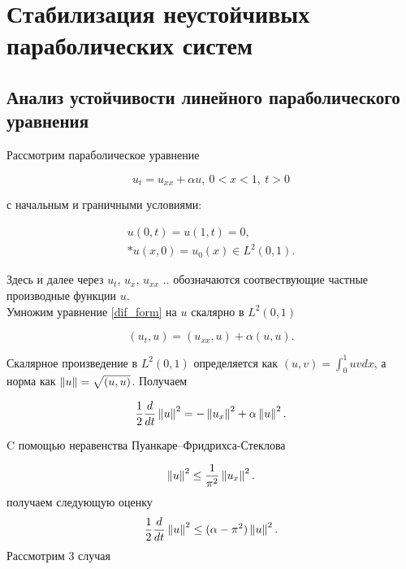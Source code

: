\section{Стабилизация неустойчивых параболических систем}

\subsection{Анализ устойчивости линейного параболического уравнения}

Рассмотрим параболическое уравнение

\begin{equation}\label{dif_form}
    u_t = u_{xx} + \alpha u, \ 0 < x < 1, \ t > 0
\end{equation}

с начальным и граничными условиями:

\begin{gather}\label{d_control}
    u(0, t) = u(1, t) = 0, \\*
    u(x, 0) = u_{0}(x) \in L^2(0, 1). \nonumber
\end{gather}

Здесь и далее через $u_t$, $u_x$, $u_{xx}$ .. обозначаются соотвествующие
частные производные функции $u$.\\
Умножим уравнение \eqref{dif_form} на $u$ скалярно в $L^2(0, 1)$

\begin{equation*}
    (u_t, u) = (u_{xx}, u) + \alpha (u, u).
\end{equation*}

Скалярное произведение в $L^2(0, 1)$ определяется как $(u, v) = \int_0^1 uv dx$,
а норма как $\left\lVert u\right\rVert = \sqrt{(u, u)}$. Получаем

\begin{equation}\label{int_form}
    \frac{1}{2}\frac{d}{dt}\left\lVert u\right\rVert^2 = -\left\lVert u_x\right\rVert^2 + \alpha \left\lVert u\right\rVert^2.
\end{equation}

C помощью неравенства Пуанкаре–Фридрихса-Стеклова

\begin{equation*}
    \left\lVert u\right\rVert^2 \le \frac{1}{\pi^2} \left\lVert u_x\right\rVert^2.
\end{equation*}
получаем следующую оценку 
\begin{equation}\label{stable_opr}
    \frac{1}{2}\frac{d}{dt}\left\lVert u\right\rVert^2 \le (\alpha - \pi^2)\left\lVert u\right\rVert^2.
\end{equation}
Рассмотрим 3 случая

